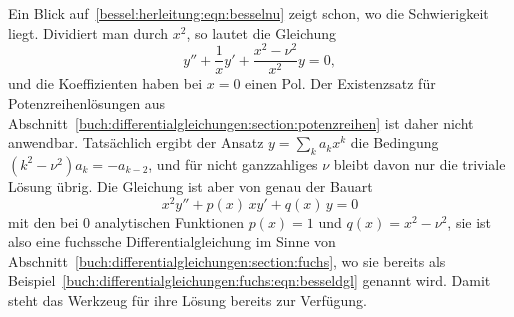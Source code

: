 Ein Blick auf~\eqref{bessel:herleitung:eqn:besselnu} zeigt schon, wo die Schwierigkeit liegt.
Dividiert man durch $x^2$, so lautet die Gleichung
\[
y''
+
\frac{1}{x}y'
+
\frac{x^2-\nu^2}{x^2}y
=
0,
\]
und die Koeffizienten haben bei $x=0$ einen Pol.
Der Existenzsatz für Potenzreihenlösungen aus Abschnitt~\ref{buch:differentialgleichungen:section:potenzreihen} ist daher nicht anwendbar.
Tatsächlich ergibt der Ansatz $y=\sum_k a_kx^k$ die Bedingung $(k^2-\nu^2)a_k=-a_{k-2}$, und für nicht ganzzahliges $\nu$ bleibt davon nur die triviale Lösung übrig.
Die Gleichung ist aber von genau der Bauart
\[
x^2y'' + p(x)\,xy' + q(x)\,y = 0
\]
mit den bei $0$ analytischen Funktionen $p(x)=1$ und $q(x)=x^2-\nu^2$, sie ist also eine fuchssche Differentialgleichung im Sinne von Abschnitt~\ref{buch:differentialgleichungen:section:fuchs}, wo sie bereits als Beispiel~\eqref{buch:differentialgleichungen:fuchs:eqn:besseldgl} genannt wird.
%
Damit steht das Werkzeug für ihre Lösung bereits zur Verfügung.
